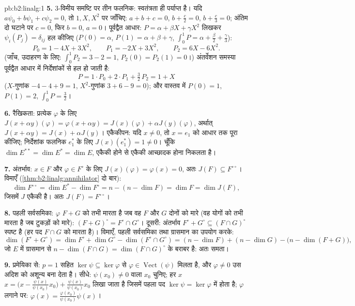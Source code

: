 \begin{solution}{pb:b2:linalg:1}
\textbf{5.} $3$-विमीय समष्टि पर तीन फलनिक: स्वतंत्रता ही पर्याप्त है।
यदि $a\psi_0 + b\psi_1 + c\psi_2 = 0$, तो $1, X,
X^2$ पर जाँचिए: $a + b + c = 0$, $b + \frac c2 = 0$, $b + \frac c3 = 0$; अंतिम दो घटाने पर $c = 0$, फिर
$b = 0$, $a = 0$। पूर्वद्वैत आधार: $P = \alpha + \beta X + \gamma X^2$ लिखकर $\psi_i(P_j) = \delta_{ij}$ हल कीजिए ($P(0) = \alpha$, $P(1) =
\alpha + \beta + \gamma$, $\int_0^1 P = \alpha + \frac\beta2 +
\frac\gamma3$):
\[
P_0 = 1 - 4X + 3X^2, \qquad
P_1 = -2X + 3X^2, \qquad
P_2 = 6X - 6X^2 .
\]
(जाँच, उदाहरण के लिए: $\int_0^1 P_2 = 3 - 2 = 1$, $P_2(0) = P_2(1) = 0$।) अंतर्वेशन समस्या पूर्वद्वैत आधार
में निर्देशांकों से हल हो जाती है:
\[
P = 1\cdot P_0 + 2\cdot P_1 + \tfrac32\, P_2 = 1 + X
\]
($X$-गुणांक $-4 - 4 + 9 = 1$, $X^2$-गुणांक $3 + 6 - 9 =
0$); और वास्तव में $P(0) = 1$, $P(1) = 2$, $\int_0^1 P = \frac32$।

\textbf{6.} रैखिकता: प्रत्येक $\varphi$ के लिए $J(x + \alpha
y)(\varphi) = \varphi(x + \alpha y) = J(x)(\varphi) + \alpha
J(y)(\varphi)$, अर्थात् $J(x + \alpha y) = J(x) + \alpha J(y)$।
एकैकीपन: यदि $x \neq 0$, तो $x = e_1$ को आधार तक पूरा कीजिए; निर्देशांक फलनिक $e_1^*$
के लिए $J(x)(e_1^*) = 1 \neq 0$। चूँकि $\dim E^{**} = \dim E^* = \dim
E$, एकैकी होने से एकैकी आच्छादक होना निकलता है।

\textbf{7.} अंतर्भाव: $x \in F$ और $\varphi \in F^\circ$ के लिए $J(x)(\varphi) = \varphi(x) = 0$, अतः $J(F) \subseteq
F^{\circ\circ}$। विमाएँ (\cref{thm:b2:linalg:annihilator} दो
बार):
\[
\dim F^{\circ\circ} = \dim E^* - \dim F^\circ
= n - (n - \dim F) = \dim F = \dim J(F),
\]
जिसमें $J$ एकैकी है। अतः $J(F) = F^{\circ\circ}$।

\textbf{8.} पहली सर्वसमिका: $\varphi$ $F + G$ को तभी मारता है जब वह $F$ और $G$
दोनों को मारे (वह योगों को तभी मारता है जब टुकड़ों को मारे): $(F+G)^\circ = F^\circ \cap G^\circ$।
दूसरी: अंतर्भाव $F^\circ + G^\circ \subseteq (F \cap G)^\circ$ स्पष्ट है (हर पद $F \cap G$ को मारता है)। विमाएँ, पहली
सर्वसमिका तथा ग्रासमान का उपयोग करके:
\[
\dim(F^\circ + G^\circ) = \dim F^\circ + \dim G^\circ -
\dim(F^\circ \cap G^\circ)
= (n - \dim F) + (n - \dim G) - \bigl(n - \dim(F +
G)\bigr),
\]
जो $E$ में ग्रासमान से $n - \dim(F \cap G) = \dim(F
\cap G)^\circ$ के बराबर है: अतः समता।

\textbf{9.} प्रमेयिका से: $p = 1$ सहित $\ker\psi \subseteq \ker\varphi$ से $\varphi \in \operatorname{Vect}(\psi)$ मिलता है, और $\varphi \neq 0$ उस
अदिश को अशून्य बना देता है। सीधे: $\psi(x_0) \neq 0$ वाला $x_0$ चुनिए; हर $x$ $x = \bigl(x -
\frac{\psi(x)}{\psi(x_0)}x_0\bigr) + \frac{\psi(x)}{\psi(x_0)}
x_0$ लिखा
जाता है जिसमें पहला पद $\ker\psi = \ker\varphi$ में होता है; $\varphi$ लगाने पर: $\varphi(x) = \frac{\varphi(x_0)}{\psi(x_0)}\psi(x)$।


\end{solution}
